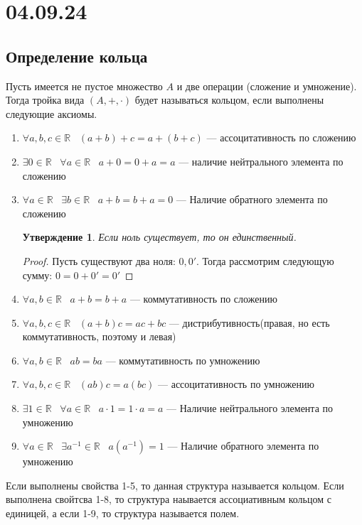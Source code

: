 \documentclass[12pt, a4paper]{article}
\newcommand{\re}{\mathds{R}}
\theoremstyle{plain}
\newtheorem*{Statement*}{Утверждение}
\theoremstyle{definition}
\begin{document}
\section*{04.09.24}
\subsection*{Определение кольца}
Пусть имеется не пустое множество $A$ и две операции (сложение и умножение). Тогда тройка вида $(A, +, \cdot)$ будет называться кольцом, если выполнены следующие аксиомы.
\begin{enumerate}
    \item $\forall a,b,c \in \re \;\;\;(a+b)+c = a+(b+c)$ --- ассоцитативность по сложению
    \item $\exists 0 \in \re\;\;\; \forall a\in \re\;\;\; a+0=0+a=a$ --- наличие нейтрального элемента по сложению
    \item $\forall a \in \re \;\;\; \exists b\in\re \;\;\; a+b=b+a=0$ --- Наличие обратного элемента по сложению
    
    
    \begin{Statement*}
        Если ноль существует, то он единственный.
    \end{Statement*}
    \begin{proof}
        Пусть существуют два ноля: $0,0'$. Тогда рассмотрим следующую сумму:
        $0 = 0 + 0' = 0'$
    \end{proof}
    
    \item $\forall a,b \in \re \;\;\; a+b = b+a$ --- коммутативность по сложению
    \item  $\forall a,b,c \in \re \;\;\;(a+b)c = ac+bc$ --- дистрибутивность(правая, но есть коммутативность, поэтому и левая)
    \item $\forall a,b \in \re \;\;\; ab = ba$ --- коммутативность по умножению
    \item  $\forall a,b,c \in \re \;\;\;(ab)c = a(bc)$ --- ассоцитативность по умножению
    \item  $\exists 1 \in \re\;\;\; \forall a\in \re\;\;\; a\cdot1=1\cdot a=a$ --- Наличие нейтрального элемента по умножению
    \item  $\forall a \in \re \;\;\; \exists a^{-1}\in\re \;\;\; a(a^{-1})=1$ --- Наличие обратного элемента по умножению
        
\end{enumerate}
Если выполнены свойства 1-5, то данная структура называется кольцом. Если выполнена свойтсва 1-8, то структура наывается ассоциативным кольцом с единицей, а если 1-9, то структура называется полем.
\end{document}
